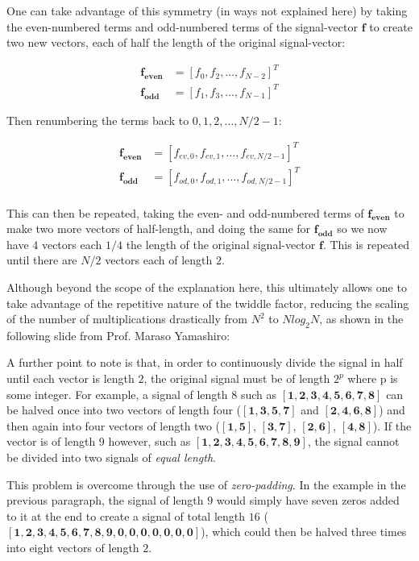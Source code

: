 One can take advantage of this symmetry (in ways not explained here) by taking the even-numbered terms and odd-numbered terms of the signal-vector $\bm{f}$ to create two new vectors, each of half the length of the original signal-vector:

\begin{align}
    \bm{f_{even}} &= [f_0, f_2, \dots, f_{N-2}]^T \\
    \bm{f_{odd}} &= [f_1, f_3, \dots, f_{N-1}]^T
\end{align}

Then renumbering the terms back to $0, 1, 2, \dots, N/2-1$:

\begin{align}
    \bm{f_{even}} &= [f_{ev,0}, f_{ev,1}, \dots, f_{ev,N/2-1}]^T \\
    \bm{f_{odd}} &= [f_{od,0}, f_{od,1}, \dots, f_{od,N/2-1}]^T \\
\end{align}

This can then be repeated, taking the even- and odd-numbered terms of $\bm{f_{even}}$ to make two more vectors of half-length, and doing the same for $\bm{f_{odd}}$ so we now have 4 vectors each $1/4$ the length of the original signal-vector $\bm{f}$. This is repeated until there are $N/2$ vectors each of length $2$.

Although beyond the scope of the explanation here, this ultimately allows one to take advantage of the repetitive nature of the twiddle factor, reducing the scaling of the number of multiplications drastically from $N^2$ to $Nlog_2 N$, as shown in the following slide from Prof. Maraso Yamashiro:



A further point to note is that, in order to continuously divide the signal in half until each vector is length $2$, the original signal must be of length $2^p$ where p is some integer. For example, a signal of length $8$ such as $\bm{[1,2,3,4,5,6,7,8]}$ can be halved once into two vectors of length four ($\bm{[1,3,5,7]}$ and $\bm{[2,4,6,8]}$) and then again into four vectors of length two ($\bm{[1,5]}$, $\bm{[3,7]}$, $\bm{[2,6]}$, $\bm{[4,8]}$). If the vector is of length 9 however, such as $\bm{[1,2,3,4,5,6,7,8,9]}$, the signal cannot be divided into two signals of \emph{equal length}.

This problem is overcome through the use of \emph{zero-padding}. In the example in the previous paragraph, the signal of length $9$ would simply have seven zeros added to it at the end to create a signal of total length $16$ ($\bm{[1,2,3,4,5,6,7,8,9,0,0,0,0,0,0,0]}$), which could then be halved three times into eight vectors of length $2$.

